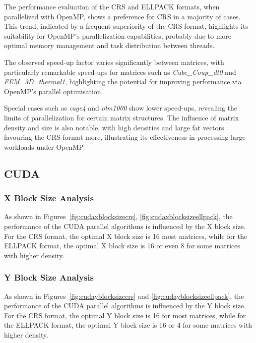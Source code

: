 \documentclass[12pt,oneside]{book} %
\begin{document}
\newpage
The performance evaluation of the CRS and ELLPACK formats, when parallelized
with OpenMP, shows a preference for CRS in a majority of cases. This trend,
indicated by a frequent superiority of the CRS format, highlights its
suitability for OpenMP's parallelization capabilities, probably due to more
optimal memory management and task distribution between threads.

The observed speed-up factor varies significantly between matrices, with
particularly remarkable speed-ups for matrices such as \textit{Cube\_Coup\_dt0}
and \textit{FEM\_3D\_thermal1}, highlighting the potential for improving
performance via OpenMP's parallel optimisation.

Special cases such as \textit{cage4} and \textit{olm1000} show lower speed-ups,
revealing the limits of parallelization for certain matrix structures. The
influence of matrix density and size is also notable, with high densities and
large fat vectors favouring the CRS format more, illustrating its effectiveness
in processing large workloads under OpenMP.

\newpage
\subsection{CUDA}

\subsubsection{X Block Size Analysis}


As shown in Figures~\ref{fig:cudaxblocksizecrs},
\ref{fig:cudaxblocksizeellpack}, the performance of the CUDA parallel
algorithms is influenced by the X block size. For the CRS format, the optimal X
block size is 16 most matrices, while for the ELLPACK format, the optimal X
block size is 16 or even 8 for some matrices with higher density.

\subsubsection{Y Block Size Analysis}


As shown in Figures~\ref{fig:cudayblocksizecrs} and
\ref{fig:cudayblocksizeellpack}, the performance of the CUDA parallel
algorithms is influenced by the Y block size. For the CRS format, the optimal Y
block size is 16 for most matrices, while for the ELLPACK format, the optimal Y
block size is 16 or 4 for some matrices with higher density.
\end{document}

